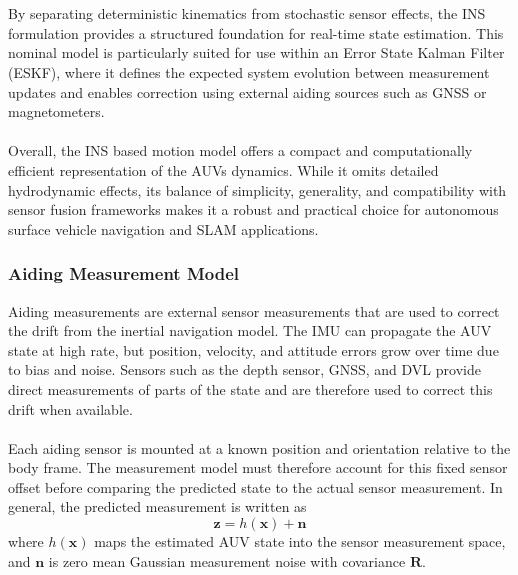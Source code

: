 \\ \\
By separating deterministic kinematics from stochastic sensor effects, the INS formulation provides a structured foundation for real-time state estimation. This nominal model is particularly suited for use within an Error State Kalman Filter (ESKF), where it defines the expected system evolution between measurement updates and enables correction using external aiding sources such as GNSS or magnetometers.  
\\ \\
Overall, the INS based motion model offers a compact and computationally efficient representation of the AUVs dynamics. While it omits detailed hydrodynamic effects, its balance of simplicity, generality, and compatibility with sensor fusion frameworks makes it a robust and practical choice for autonomous surface vehicle navigation and SLAM applications.



\subsubsection{Aiding Measurement Model}
Aiding measurements are external sensor measurements that are used to correct the drift from the inertial navigation model. The IMU can propagate the AUV state at high rate, but position, velocity, and attitude errors grow over time due to bias and noise. Sensors such as the depth sensor, GNSS, and DVL provide direct measurements of parts of the state and are therefore used to correct this drift when available.
\\ \\
Each aiding sensor is mounted at a known position and orientation relative to the body frame. The measurement model must therefore account for this fixed sensor offset before comparing the predicted state to the actual sensor measurement. In general, the predicted measurement is written as
$$
    \mathbf{z} = h(\mathbf{x}) + \mathbf{n}
$$
where $h(\mathbf{x})$ maps the estimated AUV state into the sensor measurement space, and $\mathbf{n}$ is zero mean Gaussian measurement noise with covariance $\mathbf{R}$.



